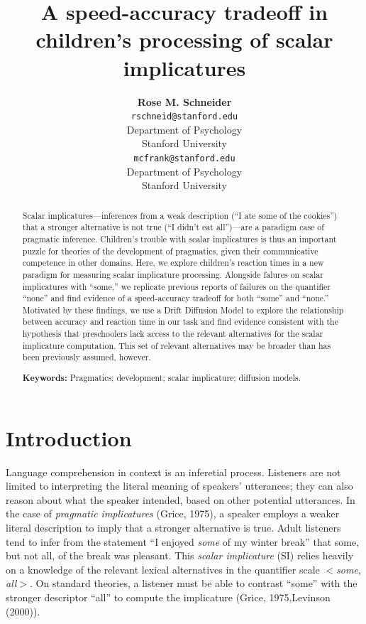 \documentclass[10pt, letterpaper]{article}
\title{A speed-accuracy tradeoff in children's processing of scalar
implicatures}
\author{{\large \bf Rose M. Schneider} \\ \texttt{rschneid@stanford.edu} \\ Department of Psychology \\ Stanford University \And {\large \bf Michael C. Frank} \\ \texttt{mcfrank@stanford.edu} \\ Department of Psychology \\ Stanford University}
\begin{document}
\maketitle

\begin{abstract}
Scalar implicatures---inferences from a weak description (``I ate some
of the cookies'') that a stronger alternative is not true (``I didn't
eat all'')---are a paradigm case of pragmatic inference. Children's
trouble with scalar implicatures is thus an important puzzle for
theories of the development of pragmatics, given their communicative
competence in other domains. Here, we explore children's reaction times
in a new paradigm for measuring scalar implicature processing. Alongside
falures on scalar implicatures with ``some,'' we replicate previous
reports of failures on the quantifier ``none'' and find evidence of a
speed-accuracy tradeoff for both ``some'' and ``none.'' Motivated by
these findings, we use a Drift Diffusion Model to explore the
relationship between accuracy and reaction time in our task and find
evidence consistent with the hypothesis that preschoolers lack access to
the relevant alternatives for the scalar implicature computation. This
set of relevant alternatives may be broader than has been previously
assumed, however.

\textbf{Keywords:}
Pragmatics; development; scalar implicature; diffusion models.
\end{abstract}

\section{Introduction}\label{introduction}

Language comprehension in context is an inferetial process. Listeners
are not limited to interpreting the literal meaning of speakers'
utterances; they can also reason about what the speaker intended, based
on other potential utterances. In the case of \emph{pragmatic
implicatures} (Grice, 1975), a speaker employs a weaker literal
description to imply that a stronger alternative is true. Adult
listeners tend to infer from the statement ``I enjoyed \emph{some} of my
winter break'' that some, but not all, of the break was pleasant. This
\emph{scalar implicature} (SI) relies heavily on a knowledge of the
relevant lexical alternatives in the quantifier scale \(<\)\emph{some},
\emph{all}\(>\). On standard theories, a listener must be able to
contrast ``some'' with the stronger descriptor ``all'' to compute the
implicature (Grice, 1975,Levinson (2000)).
\end{document}
